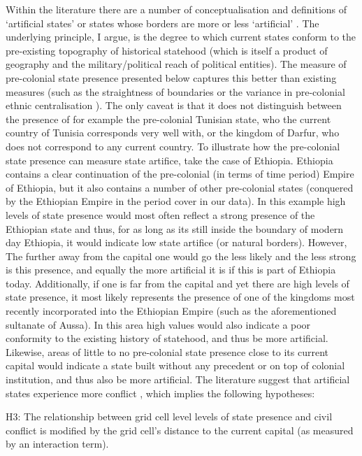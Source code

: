 \documentclass[12pt]{article}
\begin{document}
\begin{multicols}{2}
Within the literature there are a number of conceptualisation and definitions of
`artificial states' or states whose borders are more or less `artificial'
\citep{Alesina2011, Clapham1996, Englebert2002, Herbst2014}. The underlying
principle, I argue, is the degree to which current states conform to the
pre-existing topography of historical statehood (which is itself a product of
geography and the military/political reach of political entities). The measure
of pre-colonial state presence presented below captures this better than
existing measures (such as the straightness of boundaries \citep{Alesina2011} or
the variance in pre-colonial ethnic centralisation \citep{Englebert2002}). The
only caveat is that it does not distinguish between the presence of for example
the pre-colonial Tunisian state, who the current country of Tunisia corresponds
very well with, or the kingdom of Darfur, who does not correspond to any current
country. To illustrate how the pre-colonial state presence can measure state
artifice, take the case of Ethiopia. Ethiopia contains a clear continuation of
the pre-colonial (in terms of time period) Empire of Ethiopia, but it also
contains a number of other pre-colonial states (conquered by the Ethiopian
Empire in the period cover in our data). In this example high levels of state
presence would most often reflect a strong presence of the Ethiopian state and
thus, for as long as its still inside the boundary of modern day Ethiopia, it
would indicate low state artifice (or natural borders). However, The further
away from the capital one would go the less likely and the less strong is this
presence, and equally the more artificial it is if this is part of Ethiopia
today. Additionally, if one is far from the capital and yet there are high
levels of state presence, it most likely represents the presence of one of the
kingdoms most recently incorporated into the Ethiopian Empire (such as the
aforementioned sultanate of Aussa). In this area high values would also indicate
a poor conformity to the existing history of statehood, and thus be more
artificial.  Likewise, areas of little to no pre-colonial state presence close
to its current capital would indicate a state built without any precedent or on
top of colonial institution, and thus also be more artificial. The literature
suggest that artificial states experience more conflict 
\citep{Alesina2011, Englebert2002}, which implies the following hypotheses:

H3: The relationship between grid cell level levels of state presence and civil
conflict is modified by the grid cell's distance to the current capital (as
measured by an interaction term).


\end{multicols}
\end{document}
